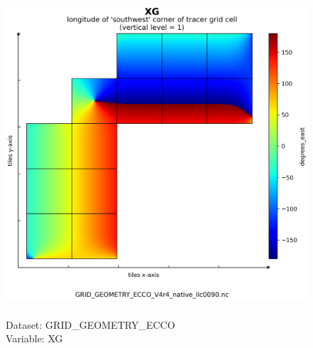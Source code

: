 \begin{figure}[H]
\centering
\includegraphics[scale=0.5]{../images/plots/native_plots_coords/Geometry_Parameters_for_the_Lat-Lon-Cap_90_(llc90)_Native_Model_Grid_(Version_4_Release_4)/XG.png}
\caption{\\Dataset: GRID\_GEOMETRY\_ECCO\\Variable: XG}
\label{tab:table-GRID_GEOMETRY_ECCO_XG-Plot}
\end{figure}
\pagebreak
